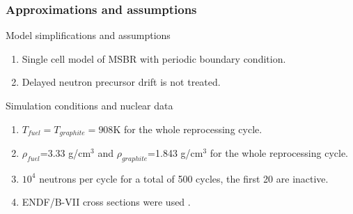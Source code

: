 \begin{frame}
  \frametitle{Approximations and assumptions}
              \begin{block}{Model simplifications and assumptions}
               \begin{enumerate}
               \item Single cell model of \gls{MSBR} with periodic boundary condition.
               \item Delayed neutron precursor drift is not treated.
               \end{enumerate}
               \end{block}

               \begin{block}{Simulation conditions and nuclear data}
               \begin{enumerate}
               \item $T_{fuel}=T_{graphite}=908$K for the whole reprocessing cycle.
               \item $\rho_{fuel}$=3.33 g/cm$^3$ and $\rho_{graphite}$=1.843 g/cm$^3$  for the whole reprocessing cycle.
               \item $10^4$ neutrons per cycle for a total of 500 cycles,
                 the first 20 are inactive.
               \item ENDF/B-VII cross sections were used \cite{chadwick_endf}.
               \end{enumerate}
               \end{block}
\end{frame}


